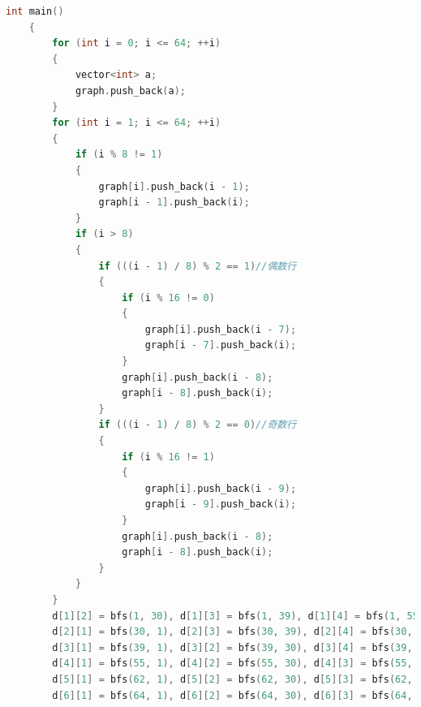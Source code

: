 \documentclass[withoutpreface,bwprint]{cumcmthesis} %
\begin{document}
\begin{appendices}
\begin{lstlisting}[language=c++]
    int main()
    {
        for (int i = 0; i <= 64; ++i)
        {
            vector<int> a;
            graph.push_back(a);
        }
        for (int i = 1; i <= 64; ++i)
        {
            if (i % 8 != 1)
            {
                graph[i].push_back(i - 1);
                graph[i - 1].push_back(i);
            }
            if (i > 8)
            {
                if (((i - 1) / 8) % 2 == 1)//偶数行
                {
                    if (i % 16 != 0)
                    {
                        graph[i].push_back(i - 7);
                        graph[i - 7].push_back(i);
                    }
                    graph[i].push_back(i - 8);
                    graph[i - 8].push_back(i);
                }
                if (((i - 1) / 8) % 2 == 0)//奇数行
                {
                    if (i % 16 != 1)
                    {
                        graph[i].push_back(i - 9);
                        graph[i - 9].push_back(i);
                    }
                    graph[i].push_back(i - 8);
                    graph[i - 8].push_back(i);
                }
            }
        }
        d[1][2] = bfs(1, 30), d[1][3] = bfs(1, 39), d[1][4] = bfs(1, 55), d[1][5] = bfs(1, 62), d[1][6] = bfs(1, 64);
        d[2][1] = bfs(30, 1), d[2][3] = bfs(30, 39), d[2][4] = bfs(30, 55), d[2][5] = bfs(30, 62), d[2][6] = bfs(30, 64);
        d[3][1] = bfs(39, 1), d[3][2] = bfs(39, 30), d[3][4] = bfs(39, 55), d[3][5] = bfs(39, 62), d[3][6] = bfs(39, 64);
        d[4][1] = bfs(55, 1), d[4][2] = bfs(55, 30), d[4][3] = bfs(55, 39), d[4][5] = bfs(55, 62), d[4][6] = bfs(55, 64);
        d[5][1] = bfs(62, 1), d[5][2] = bfs(62, 30), d[5][3] = bfs(62, 39), d[5][4] = bfs(62, 55), d[5][6] = bfs(62, 64);
        d[6][1] = bfs(64, 1), d[6][2] = bfs(64, 30), d[6][3] = bfs(64, 39), d[6][4] = bfs(64, 55), d[6][5] = bfs(64, 62);
        

\end{lstlisting}
\end{appendices}
\end{document}
